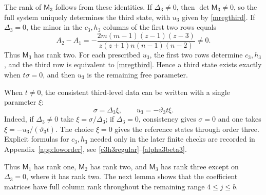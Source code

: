 \documentclass[10pt,a4paper]{amsart}
\begin{document}
The rank of $\mathsf M_3$ follows from these identities.  If $\Delta_3\ne0$, then
$\det \mathsf M_3\ne0$, so the full system uniquely determines the third state, with $u_3$
given by \eqref{mregthird}.  If $\Delta_3=0$, the minor in the
$c_3,h_3$ columns of the first two rows equals
\[
 A_2-A_1=
 -\frac{2m(m-1)(z-1)(z-3)}{z(z+1)n(n-1)(n-2)}\ne0.
\]
Thus $\mathsf M_3$ has rank two.  For each prescribed $u_3$, the first two
rows determine $c_3,h_3$, and the third row is equivalent to
\eqref{mregthird}.  Hence a third state exists exactly when
$t\sigma=0$, and then $u_3$ is the remaining free parameter.

When $t\ne0$, the consistent third-level data can be written with a
single parameter $\xi$:
\begin{equation}\label{mregxi}
 \sigma=\Delta_3\xi,\qquad
 u_3=-\vartheta_3t\xi.
\end{equation}
Indeed, if $\Delta_3\ne0$ take $\xi=\sigma/\Delta_3$; if
$\Delta_3=0$, consistency gives $\sigma=0$ and one takes
$\xi=-u_3/(\vartheta_3t)$.  The choice $\xi=0$ gives the reference
states through order three.  Explicit formulas for $c_3,h_3$ needed
only in the later finite checks are recorded in
Appendix~\ref{app:loworder}, see \eqref{c3h3regular}--\eqref{alpha3beta3}.

Thus $\mathsf M_1$ has rank one, $\mathsf M_2$ has rank two, and
$\mathsf M_3$ has rank three except on $\Delta_3=0$, where it has
rank two.  The next lemma shows that the coefficient matrices have
full column rank throughout the remaining range $4\le j\le b$.
\end{document}
